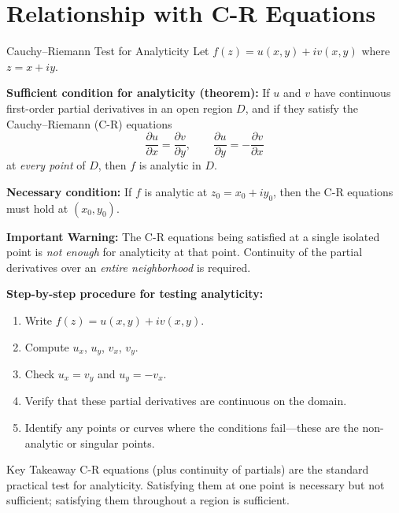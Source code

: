 \documentclass[12pt,a4paper]{article}
\begin{document}
\section{Relationship with C-R Equations}

\begin{infobox}{Cauchy--Riemann Test for Analyticity}
Let $f(z) = u(x,y) + iv(x,y)$ where $z = x+iy$.

\textbf{Sufficient condition for analyticity (theorem):}
If $u$ and $v$ have continuous first-order partial derivatives in an open region
$D$, and if they satisfy the Cauchy--Riemann (C-R) equations
\[
  \frac{\partial u}{\partial x} = \frac{\partial v}{\partial y}, \qquad
  \frac{\partial u}{\partial y} = -\frac{\partial v}{\partial x}
\]
at \emph{every point} of $D$, then $f$ is analytic in $D$.

\textbf{Necessary condition:}
If $f$ is analytic at $z_0 = x_0 + iy_0$, then the C-R equations must hold at
$(x_0, y_0)$.

\textbf{Important Warning:}
The C-R equations being satisfied at a single isolated point is \emph{not enough}
for analyticity at that point. Continuity of the partial derivatives over an
\emph{entire neighborhood} is required.
\end{infobox}

\textbf{Step-by-step procedure for testing analyticity:}
\begin{enumerate}
  \item Write $f(z) = u(x,y) + iv(x,y)$.
  \item Compute $u_x$, $u_y$, $v_x$, $v_y$.
  \item Check $u_x = v_y$ and $u_y = -v_x$.
  \item Verify that these partial derivatives are continuous on the domain.
  \item Identify any points or curves where the conditions fail---these are
        the non-analytic or singular points.
\end{enumerate}

\begin{learnbox}{Key Takeaway}
C-R equations (plus continuity of partials) are the standard practical test for analyticity. Satisfying them at one point is necessary but not sufficient; satisfying them throughout a region is sufficient.
\end{learnbox}

\end{document}
